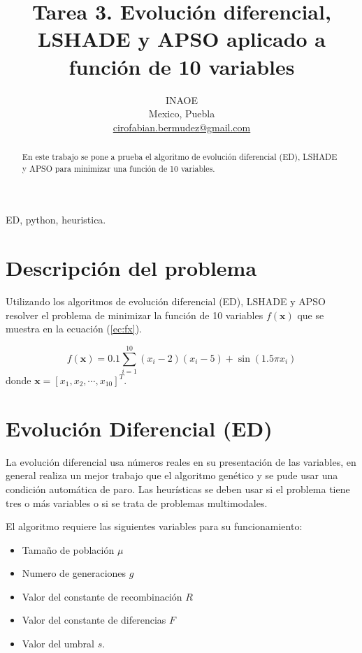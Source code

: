 \documentclass[conference]{IEEEtran}
\begin{document}
\title{Tarea 3. Evolución diferencial, LSHADE y APSO aplicado a función de 10 variables
}

\author{
INAOE\\
Mexico, Puebla \\
\url{cirofabian.bermudez@gmail.com}
}

\maketitle

\begin{abstract}
En este trabajo se pone a prueba el algoritmo de evolución diferencial (ED), LSHADE y APSO para minimizar una función de 10 variables. 
\end{abstract}

\begin{IEEEkeywords}
ED, python, heuristica.
\end{IEEEkeywords}

\section{Descripción del problema}

Utilizando los algoritmos de evolución diferencial (ED), LSHADE y APSO resolver el problema de minimizar la función de 10 variables $f(\mathbf{x})$ que se muestra en la ecuación (\ref{ec:fx}).

\begin{equation}
 f(\mathbf{x}) = 0.1 \sum_{i=1} ^{10} (x_{i} -2)(x_{i} -5) + \sin(1.5 \pi x_{i})
 \label{ec:fx}
\end{equation} 
donde $\mathbf{x} = \left[ x_{1}, x_{2}, \cdots, x_{10} \right]^{T}$.


\section{Evolución Diferencial (ED)}

La evolución diferencial usa números reales en su presentación de las variables, en general realiza un mejor trabajo que el algoritmo genético y se pude usar una condición automática de paro. 
Las heurísticas se deben usar si el problema tiene tres o más variables o si se trata de problemas multimodales.

El algoritmo requiere las siguientes variables para su funcionamiento:
\begin{itemize}
\item Tamaño de población $\mu$
\item Numero de generaciones $g$
\item Valor del constante de recombinación $R$
\item Valor del constante de diferencias $F$
\item Valor del umbral $s$.
\end{itemize}
\end{document}
